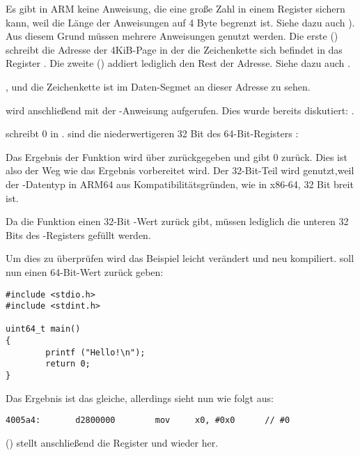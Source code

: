 Es gibt in ARM keine Anweisung, die eine große Zahl in einem Register sichern kann, weil die Länge der
Anweisungen auf 4 Byte begrenzt ist. Siehe dazu auch ).
Aus diesem Grund müssen mehrere Anweisungen genutzt werden. Die erste () schreibt die Adresse
der 4KiB-Page in der die Zeichenkette sich befindet in das Register .
Die zweite (\ADD) addiert lediglich den Rest der Adresse.
Siehe dazu auch .

, und die Zeichenkette  ist im  Daten-Segmet
an dieser Adresse zu sehen.


\puts wird anschließend mit der -Anweisung aufgerufen. Dies wurde bereits diskutiert: .

\MOV schreibt 0 in .
 sind die niederwertigeren 32 Bit des 64-Bit-Registers :



Das Ergebnis der Funktion wird über  zurückgegeben und \main gibt 0 zurück.
Dies ist also der Weg wie das Ergebnis vorbereitet wird.
Der 32-Bit-Teil wird genutzt,weil der \Tint-Datentyp in ARM64 aus Kompatibilitätsgründen,
wie in x86-64, 32 Bit breit ist.

Da die Funktion einen 32-Bit \Tint-Wert zurück gibt, müssen lediglich die unteren 32 Bits des
-Registers gefüllt werden.

Um dies zu überprüfen wird das Beispiel leicht verändert und neu kompiliert.
\main soll nun einen 64-Bit-Wert zurück geben:

\begin{lstlisting}[caption=\main gibt einen \TT{uint64\_t}-Datentyp zurück,style=customc]
#include <stdio.h>
#include <stdint.h>

uint64_t main()
{
        printf ("Hello!\n");
        return 0;
}
\end{lstlisting}

Das Ergebnis ist das gleiche, allerdings sieht \MOV nun wie folgt aus:

\begin{lstlisting}[caption=\NonOptimizing GCC 4.8.1 + objdump]
  4005a4:       d2800000        mov     x0, #0x0      // #0
\end{lstlisting}


 () stellt anschließend die Register  und  wieder her.

